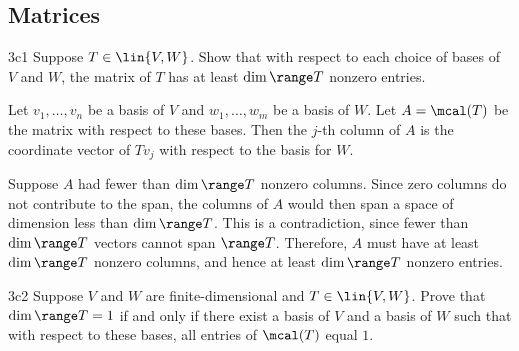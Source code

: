 \subsection{Matrices}

\begin{exercise}{3c1}
    Suppose $T \in \lin{V, W}$.
	Show that with respect to each choice of bases of $V$ and $W$, the matrix of $T$ has at least $\dim \range T$ nonzero entries.
\end{exercise}

\begin{sol}
    Let $v_1, \ldots, v_n$ be a basis of $V$ and $w_1, \ldots, w_m$ be a basis of $W$.
	Let $A = \mcal(T)$ be the matrix with respect to these bases.
	Then the $j$-th column of $A$ is the coordinate vector of $Tv_j$ with respect to the basis for $W$.

    Suppose $A$ had fewer than $\dim \range T$ nonzero columns.
	Since zero columns do not contribute to the span, the columns of $A$ would then span a space of dimension less than $\dim \range T$.
	This is a contradiction, since fewer than $\dim \range T$ vectors cannot span $\range T$.
	Therefore, $A$ must have at least $\dim \range T$ nonzero columns, and hence at least $\dim \range T$ nonzero entries.
\end{sol}

\begin{exercise}{3c2}
    Suppose $V$ and $W$ are finite-dimensional and $T \in \lin{V, W}$.
	Prove that $\dim \range T = 1$ if and only if there exist a basis of $V$ and a basis of $W$ such that with respect to these bases, all entries of $\mcal(T)$ equal $1$.
\end{exercise}

